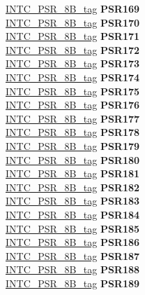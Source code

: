 \begin{DoxyCompactItemize}
\begin{tabbing}
\>\>\mbox{\hyperlink{unionINTC__PSR__8B__tag}{INTC\_PSR\_8B\_tag}} {\bfseries PSR169}\\
\>\>\mbox{\hyperlink{unionINTC__PSR__8B__tag}{INTC\_PSR\_8B\_tag}} {\bfseries PSR170}\\
\>\>\mbox{\hyperlink{unionINTC__PSR__8B__tag}{INTC\_PSR\_8B\_tag}} {\bfseries PSR171}\\
\>\>\mbox{\hyperlink{unionINTC__PSR__8B__tag}{INTC\_PSR\_8B\_tag}} {\bfseries PSR172}\\
\>\>\mbox{\hyperlink{unionINTC__PSR__8B__tag}{INTC\_PSR\_8B\_tag}} {\bfseries PSR173}\\
\>\>\mbox{\hyperlink{unionINTC__PSR__8B__tag}{INTC\_PSR\_8B\_tag}} {\bfseries PSR174}\\
\>\>\mbox{\hyperlink{unionINTC__PSR__8B__tag}{INTC\_PSR\_8B\_tag}} {\bfseries PSR175}\\
\>\>\mbox{\hyperlink{unionINTC__PSR__8B__tag}{INTC\_PSR\_8B\_tag}} {\bfseries PSR176}\\
\>\>\mbox{\hyperlink{unionINTC__PSR__8B__tag}{INTC\_PSR\_8B\_tag}} {\bfseries PSR177}\\
\>\>\mbox{\hyperlink{unionINTC__PSR__8B__tag}{INTC\_PSR\_8B\_tag}} {\bfseries PSR178}\\
\>\>\mbox{\hyperlink{unionINTC__PSR__8B__tag}{INTC\_PSR\_8B\_tag}} {\bfseries PSR179}\\
\>\>\mbox{\hyperlink{unionINTC__PSR__8B__tag}{INTC\_PSR\_8B\_tag}} {\bfseries PSR180}\\
\>\>\mbox{\hyperlink{unionINTC__PSR__8B__tag}{INTC\_PSR\_8B\_tag}} {\bfseries PSR181}\\
\>\>\mbox{\hyperlink{unionINTC__PSR__8B__tag}{INTC\_PSR\_8B\_tag}} {\bfseries PSR182}\\
\>\>\mbox{\hyperlink{unionINTC__PSR__8B__tag}{INTC\_PSR\_8B\_tag}} {\bfseries PSR183}\\
\>\>\mbox{\hyperlink{unionINTC__PSR__8B__tag}{INTC\_PSR\_8B\_tag}} {\bfseries PSR184}\\
\>\>\mbox{\hyperlink{unionINTC__PSR__8B__tag}{INTC\_PSR\_8B\_tag}} {\bfseries PSR185}\\
\>\>\mbox{\hyperlink{unionINTC__PSR__8B__tag}{INTC\_PSR\_8B\_tag}} {\bfseries PSR186}\\
\>\>\mbox{\hyperlink{unionINTC__PSR__8B__tag}{INTC\_PSR\_8B\_tag}} {\bfseries PSR187}\\
\>\>\mbox{\hyperlink{unionINTC__PSR__8B__tag}{INTC\_PSR\_8B\_tag}} {\bfseries PSR188}\\
\>\>\mbox{\hyperlink{unionINTC__PSR__8B__tag}{INTC\_PSR\_8B\_tag}} {\bfseries PSR189}\\

\end{tabbing}
\end{DoxyCompactItemize}
